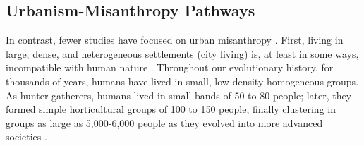 \documentclass[11pt, letterpaper]{article}
\begin{document}
\begin{spacing}{1.4}



\subsection*{Urbanism-Misanthropy Pathways}

In contrast,
fewer studies have focused on urban misanthropy 
\citep{thrift05,melgar13,keeling13,smith97,bloch87,wilson85,ray81,gibson17,rosenberg57,rosenberg56}.
First, living in large, dense, and heterogeneous settlements (city living) is, at least in some ways, incompatible with human nature \citep{haidt12B}. Throughout our evolutionary
history, for thousands of years, humans have lived in small, low-density
homogeneous groups. As hunter gatherers, humans lived in small bands of 50 to 80
people; later, they formed simple horticultural groups of 100 to 150 people,
finally clustering in groups as large as 5,000-6,000  people as they evolved
into more advanced societies \citep{maryanski92}.

\end{spacing}
\end{document}
